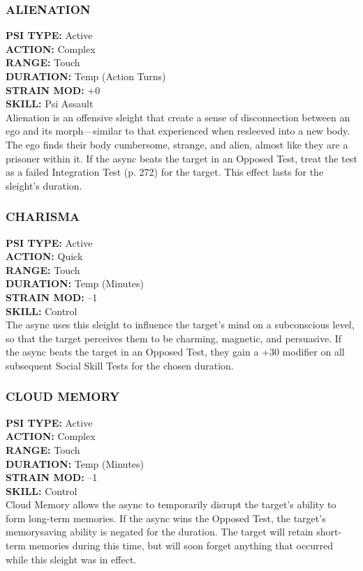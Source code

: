 \subsubsection{ALIENATION}
\textbf{PSI TYPE:} Active \\ 
\textbf{ACTION:} Complex \\ 
\textbf{RANGE:} Touch \\ 
\textbf{DURATION:} Temp (Action Turns) \\
\textbf{STRAIN MOD:} +0 \\ 
\textbf{SKILL:} Psi Assault \\
Alienation is an offensive sleight that create a sense of
disconnection between an ego and its morph—similar
to that experienced when resleeved into a new body.
The ego finds their body cumbersome, strange, and
alien, almost like they are a prisoner within it. If the
async beats the target in an Opposed Test, treat the
test as a failed Integration Test (p. 272) for the target.
This effect lasts for the sleight’s duration.

\subsubsection{CHARISMA}
\textbf{PSI TYPE:} Active \\ 
\textbf{ACTION:} Quick \\ 
\textbf{RANGE:} Touch \\ 
\textbf{DURATION:} Temp (Minutes) \\
\textbf{STRAIN MOD:} –1 \\ 
\textbf{SKILL:} Control\\
The async uses this sleight to influence the target’s
mind on a subconscious level, so that the target perceives
them to be charming, magnetic, and persuasive.
If the async beats the target in an Opposed Test, they
gain a +30 modifier on all subsequent Social Skill
Tests for the chosen duration.

\subsubsection{CLOUD MEMORY}
\textbf{PSI TYPE:} Active \\ 
\textbf{ACTION:} Complex \\ 
\textbf{RANGE:} Touch \\ 
\textbf{DURATION:} Temp (Minutes) \\
\textbf{STRAIN MOD:} –1 \\ 
\textbf{SKILL:} Control\\
Cloud Memory allows the async to temporarily disrupt
the target’s ability to form long-term memories. If
the async wins the Opposed Test, the target’s memorysaving
ability is negated for the duration. The target
will retain short-term memories during this time, but
will soon forget anything that occurred while this
sleight was in effect.

